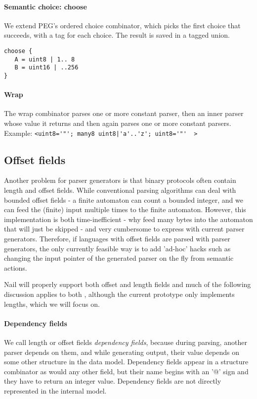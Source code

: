 \documentclass[10pt]{article}
\begin{document}
\paragraph{Semantic choice: choose}
We extend PEG's ordered choice combinator, which picks the first choice that succeeds, with a tag
for each choice. The result is saved in a tagged union. 

\begin{verbatim}
choose {
   A = uint8 | 1.. 8
   B = uint16 | ..256
}
\end{verbatim}
\paragraph{Wrap}

The wrap combinator parses one or more constant parser, then an inner parser whose value it returns
and then again parses one or more constant parsers.\\ Example: 
\verb+<uint8='"'; many8 uint8|'a'..'z'; uint8='"'  >+

\subsection{Offset fields}
Another problem for parser generators is that binary protocols often contain length and offset
fields. While conventional parsing algorithms can deal with bounded offset fields - a finite
automaton can count a bounded integer, and we can feed the (finite) input multiple times to the
finite automaton. However, this implementation is both time-inefficient - why feed many bytes into
the automaton that will just be skipped - and very cumbersome to express with current parser
generators. Therefore, if languages with offset fields are parsed with parser generators, the only
currently feasible way is to add 'ad-hoc' hacks such as changing the input pointer of the generated
parser on the fly from semantic actions. 

Nail will properly support both offset and length fields and much of the following discussion
applies to both , although the current prototype only implements lengths, which we will focus on. 

\paragraph{Dependency fields}
We call length or offset fields \textit{dependency fields}, because during parsing, another parser
depends on them, and while generating output, their value depends on some other structure in the
data model.
Dependency fields appear in a structure combinator as would any other field, but their name begins
with an '@' sign and they have to return an integer value. Dependency fields are not directly
represented in the internal model. 
\end{document}

